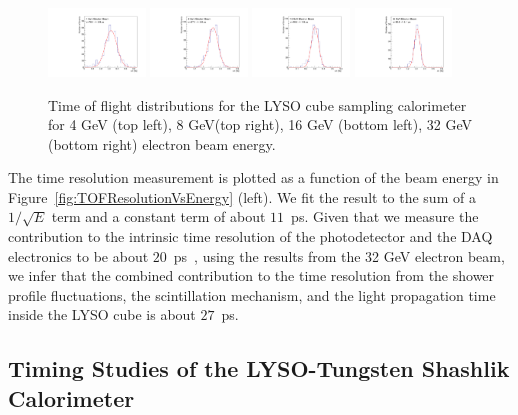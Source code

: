 \documentclass[12pt]{article}
\begin{document}
\begin{figure}[H] \centering
\includegraphics[width=0.23\textwidth]{figs/TOF_Electron_LYSOCube_4GeV} 
\includegraphics[width=0.23\textwidth]{figs/TOF_Electron_LYSOCube_8GeV} 
\includegraphics[width=0.23\textwidth]{figs/TOF_Electron_LYSOCube_16GeV} 
\includegraphics[width=0.23\textwidth]{figs/TOF_Electron_LYSOCube_32GeV} 
\caption{ \small Time of flight distributions for the LYSO cube sampling calorimeter
for 4 GeV (top left), 8 GeV(top right), 16 GeV (bottom left),  32 GeV (bottom right) electron beam energy. } 
\label{fig:LYSOCubeTOF}
\end{figure}

The time resolution measurement is plotted as a function of the
beam energy in Figure~\ref{fig:TOFResolutionVsEnergy} (left). We fit the result to the sum of a 
$1/\sqrt{E}$ term and a constant term of about $11$~ps.   Given that we measure the contribution 
to the intrinsic time resolution of the photodetector and the DAQ electronics to be about 
$20$~ps~\cite{MCPFastCaloNIMA}, using the results from the 32 GeV electron beam, we infer 
that the combined contribution to the time resolution from the shower profile
fluctuations, the scintillation mechanism, and the light propagation time inside the
LYSO cube is about $27$~ps.  

\subsection{Timing Studies of the LYSO-Tungsten Shashlik Calorimeter}
\end{document}

